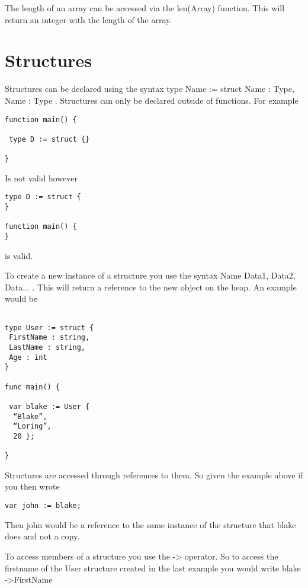 \documentclass[]{final_report}
\begin{document}
The length of an array can be accessed via the len(Array) function. This will return an integer with the length of the array.

\section{Structures}

Structures can be declared using the syntax type Name := struct { Name : Type, Name : Type }. Structures can only be declared outside of functions. For example

\begin{verbatim}
function main() {

 type D := struct {}

}
\end{verbatim}

Is not valid however

\begin{verbatim}
type D := struct {
}

function main() {
}
\end{verbatim}

is valid.

To create a new instance of a structure you use the syntax Name{ Data1, Data2, Data... }. This will return a reference to the new object on the heap. An example would be

\begin{verbatim}

type User := struct {
 FirstName : string,
 LastName : string,
 Age : int
}

func main() {
 
 var blake := User {
  “Blake”,
  “Loring”, 
  20 };

}
\end{verbatim}

Structures are accessed through references to them. So given the example above if you then wrote

\begin{verbatim}
var john := blake;
\end{verbatim}

Then john would be a reference to the same instance of the structure that blake does and not a copy. 

To access members of a structure you use the -\textgreater \vspace{1pt} operator. So to access the firstname of the User structure created in the last example you would write blake -\textgreater FirstName 
\end{document}
